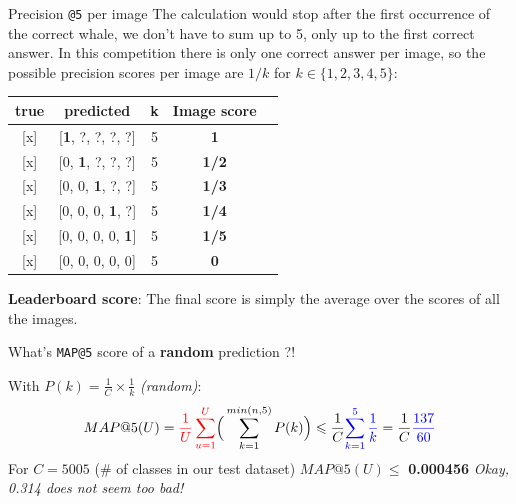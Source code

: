 \begin{frame}[c]{Precision \texttt{@5} per image}
    The calculation would stop after the first
    occurrence of the correct whale,
    we don't have to sum up to 5, only up to the first correct answer. In
    this competition there is only one correct answer per
    image, so the possible precision scores per image are $1/k$ for $k \in \{1, 2, 3, 4, 5\}$:
    
    \begin{longtable}[]{@{}ccccc@{}}
    \toprule
    true & predicted & k & Image score &\tabularnewline
    \midrule
    \endhead
    {[}x{]} & {[}\textbf{1}, ?, ?, ?, ?{]} & 5 & \textbf{1} &\tabularnewline
    {[}x{]} & {[}0, \textbf{1}, ?, ?, ?{]} & 5 & \textbf{1/2} &\tabularnewline
    {[}x{]} & {[}0, 0, \textbf{1}, ?, ?{]} & 5 & \textbf{1/3} &\tabularnewline
    {[}x{]} & {[}0, 0, 0, \textbf{1}, ?{]} & 5 & \textbf{1/4} &\tabularnewline
    {[}x{]} & {[}0, 0, 0, 0, \textbf{1}{]} & 5 & \textbf{1/5} &\tabularnewline
    {[}x{]} & {[}0, 0, 0, 0, 0{]} & 5 & \textbf{0} &\tabularnewline
    \bottomrule
    \end{longtable}
    
    \textbf{Leaderboard score}: The final score is simply the average over the scores of all the images.
\end{frame}

\begin{frame}[c]{What's \texttt{MAP@5} score of a \textbf{random} prediction ?!}
    \begin{center}
    With $P(k) = \frac{1}{C} \times \frac{1}{k}$ \emph{(random)}:
    $$MAP@5(U) = \textcolor{red}{\frac{1}{U} \sum_{u=1}^{U}} \Big( \sum_{k=1}^{min(n,5)} P(k) \Big) \leqslant \frac{1}{C} \textcolor{blue}{\sum_{k=1}^5 \frac{1}{k}} = \frac{1}{C} \textcolor{blue}{\frac{137}{60}}$$
    \newline\newline
    For $C = 5005$ (\# of classes in our test dataset)
    \newline\newline
    $MAP@5(U) \leqslant$ \textbf{0.000456}
    \newline\newline
    \tiny \emph{Okay, 0.314 does not seem too bad!}
    \end{center}
\end{frame}

